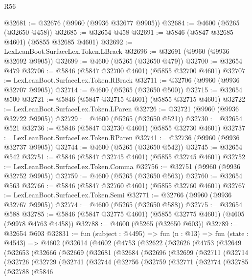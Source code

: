 \begin{lexlean}{R56}
\begin{coremodule}
@32681 := @32676 (@9960 (@9936 @32677 @9905))
@32684 := @4600 (@5265 (@32650 @458))
@32685 := @32654 @458
@32691 := @5846 (@5847 @32685 @4601) (@5855 @32685 @4601)
@32692 := LexLeanBoot.SurfaceLex.Token.LBrack
@32696 := @32691 (@9960 (@9936 @32692 @9905))
@32699 := @4600 (@5265 (@32650 @479))
@32700 := @32654 @479
@32706 := @5846 (@5847 @32700 @4601) (@5855 @32700 @4601)
@32707 := LexLeanBoot.SurfaceLex.Token.RBrack
@32711 := @32706 (@9960 (@9936 @32707 @9905))
@32714 := @4600 (@5265 (@32650 @500))
@32715 := @32654 @500
@32721 := @5846 (@5847 @32715 @4601) (@5855 @32715 @4601)
@32722 := LexLeanBoot.SurfaceLex.Token.LParen
@32726 := @32721 (@9960 (@9936 @32722 @9905))
@32729 := @4600 (@5265 (@32650 @521))
@32730 := @32654 @521
@32736 := @5846 (@5847 @32730 @4601) (@5855 @32730 @4601)
@32737 := LexLeanBoot.SurfaceLex.Token.RParen
@32741 := @32736 (@9960 (@9936 @32737 @9905))
@32744 := @4600 (@5265 (@32650 @542))
@32745 := @32654 @542
@32751 := @5846 (@5847 @32745 @4601) (@5855 @32745 @4601)
@32752 := LexLeanBoot.SurfaceLex.Token.Comma
@32756 := @32751 (@9960 (@9936 @32752 @9905))
@32759 := @4600 (@5265 (@32650 @563))
@32760 := @32654 @563
@32766 := @5846 (@5847 @32760 @4601) (@5855 @32760 @4601)
@32767 := LexLeanBoot.SurfaceLex.Token.Semi
@32771 := @32766 (@9960 (@9936 @32767 @9905))
@32774 := @4600 (@5265 (@32650 @588))
@32775 := @32654 @588
@32785 := @5846 (@5847 @32775 @4601) (@5855 @32775 @4601) (@4605 (@9978 @4763 @4458))
@32788 := @4600 (@5265 (@32650 @603))
@32789 := @32654 @603
@32831 := fun (subject : @4495) =>
  fun (n : @13) =>
  fun (state : @4543) =>
  @4602
    (@32614
      (@4602
        (@4753
          (@32622
            (@32626
              (@4753
                (@32649
                  (@32653
                    (@32666
                      (@32669
                        (@32681
                          (@32684
                            (@32696
                              (@32699
                                (@32711
                                  (@32714
                                    (@32726
                                      (@32729
                                        (@32741
                                          (@32744
                                            (@32756
                                              (@32759
                                                (@32771
                                                  (@32774
                                                    (@32785
                                                      (@32788
                                                        (@5846

\end{coremodule}
\end{lexlean}
